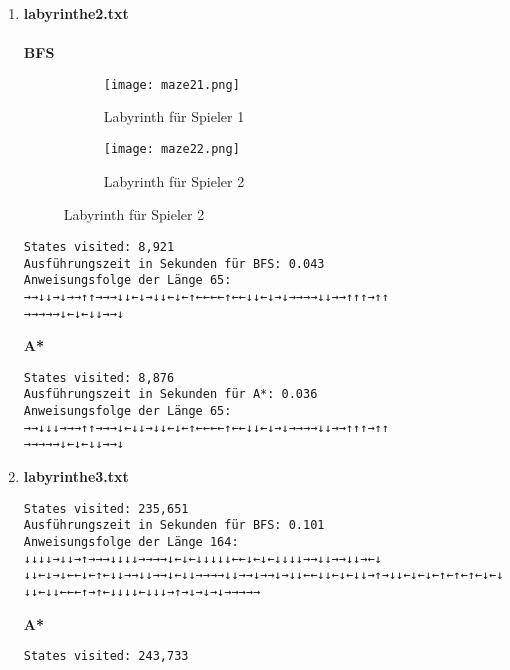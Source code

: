 \documentclass[a4paper,10pt,ngerman]{scrartcl}
\begin{document}
\begin{enumerate}
\begin{figure}[H]
\begin{subfigure}{0.45\textwidth}
        \caption{Labyrinth für Spieler 2}
    \end{subfigure}
\end{figure}
\begin{verbatim}
States visited: 342
Ausführungszeit in Sekunden für BFS: 0.031
Anweisungsfolge der Länge 31: →→→→↓↓←↑←↓←↑←↓↓→↑→↓→↑↑←←↑→→→↓↓↓
\end{verbatim}
\textbf{A*}
\begin{verbatim}
States visited: 320
Ausführungszeit in Sekunden für A*: 0.016
Anweisungsfolge der Länge 31: →→→→↓↓←↑←↓←↑←↓↓→↑→↓→↑↑←←↑→→→↓↓↓
\end{verbatim}
\newpage
  \item \textbf{labyrinthe2.txt}\\
\\\textbf{BFS}
\begin{figure}[H]
    \centering
    \begin{subfigure}{0.45\textwidth}
        \centering
        \texttt{[image: maze21.png]} 
        \caption{Labyrinth für Spieler 1}
    \end{subfigure}
    \hfill
    \begin{subfigure}{0.45\textwidth}
        \centering
        \texttt{[image: maze22.png]}
        \caption{Labyrinth für Spieler 2}
    \end{subfigure}
\end{figure}
\begin{verbatim}
States visited: 8,921
Ausführungszeit in Sekunden für BFS: 0.043
Anweisungsfolge der Länge 65: →→↓↓→↓→→↑↑→→→↓↓←↓→↓↓←↓←↑←←←←↑←←↓↓←↓→↓→→→→↓↓→→↑↑↑→↑↑
→→→→→↓←↓←↓↓→→↓
\end{verbatim}
\textbf{A*}
\begin{verbatim}
States visited: 8,876
Ausführungszeit in Sekunden für A*: 0.036
Anweisungsfolge der Länge 65: →→↓↓↓→→→↑↑→→→↓←↓↓→↓↓←↓←↑←←←←↑←←↓↓←↓→↓→→→→↓↓→→↑↑↑→↑↑
→→→→→↓←↓←↓↓→→↓
\end{verbatim}
  \item \textbf{labyrinthe3.txt}\\
\begin{verbatim}
States visited: 235,651
Ausführungszeit in Sekunden für BFS: 0.101
Anweisungsfolge der Länge 164: ↓↓↓↓→↓↓→↑→→→↓↓↓↓→→→→↓←↓←↓↓↓↓↓←←↓←↓←↓↓↓↓→→↓↓→→↓↓→←↓
↓↓←↓→↓←←↓←↑←↓↓→→↓↓→→↓←↓↓→→→→↓↓→→↓→→↓→↓↓←←↓↓←↓←↓↓→↑→↓↓←↓←↓←↑←↑←↑←↓←↓→→↓↓↓→→↑→→↑→↑→
↓↓←↓↓←←←↑→↑←↓↓↓↓←↓↓↓→↑→↓→↓→↓→→→→→
\end{verbatim}
\textbf{A*}
\begin{verbatim}
States visited: 243,733

\end{verbatim}
\end{enumerate}
\end{document}
